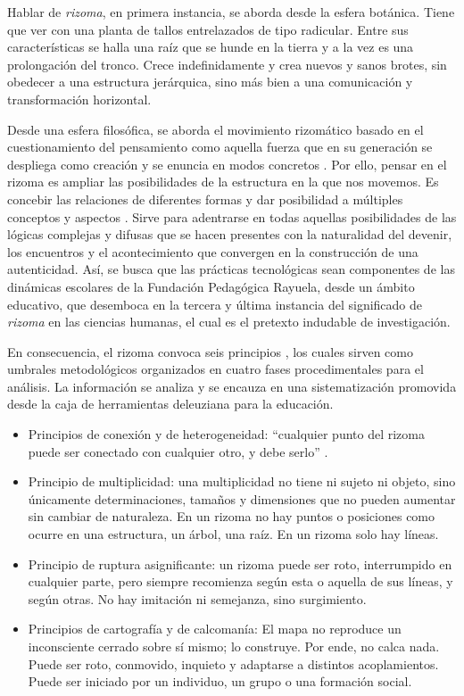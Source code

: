 \documentclass[spanish]{textolivre}
\begin{document}
Hablar de \textit{rizoma}, en primera instancia, se aborda desde la esfera botánica. Tiene que ver con una planta de tallos entrelazados de tipo radicular. Entre sus características se halla una raíz que se hunde en la tierra y a la vez es una prolongación del tronco. Crece indefinidamente y crea nuevos y sanos brotes, sin obedecer a una estructura jerárquica, sino más bien a una comunicación y transformación horizontal. 

Desde una esfera filosófica, se aborda el movimiento rizomático basado en el cuestionamiento del pensamiento como aquella fuerza que en su generación se despliega como creación y se enuncia en modos concretos \cite{rangel_ecosofi:_2007}. Por ello, pensar en el rizoma es ampliar las posibilidades de la estructura en la que nos movemos. Es concebir las relaciones de diferentes formas y dar posibilidad a múltiples conceptos y aspectos \cite{fundacion_pedagogica_rayuela_proyecto_2019}. Sirve para adentrarse en todas aquellas posibilidades de las lógicas complejas y difusas que se hacen presentes con la naturalidad del devenir, los encuentros y el acontecimiento que convergen en la construcción de una autenticidad. Así, se busca que las prácticas tecnológicas sean componentes de las dinámicas escolares de la Fundación Pedagógica Rayuela, desde un ámbito educativo, que desemboca en la tercera y última instancia del significado de \textit{rizoma} en las ciencias humanas, el cual es el pretexto indudable de investigación.

En consecuencia, el rizoma convoca seis principios \cite{deleuze_mil_1980, perez_de_lama_avispa_2009}, los cuales sirven como umbrales metodológicos organizados en cuatro fases procedimentales para el análisis. La información se analiza y se encauza en una sistematización promovida desde la caja de herramientas deleuziana para la educación. 

\begin{itemize}
    \item Principios de conexión y de heterogeneidad: “cualquier punto del rizoma puede ser conectado con cualquier otro, y debe serlo” \cite[p. 13]{deleuze_mil_1980}.
    \item Principio de multiplicidad: una multiplicidad no tiene ni sujeto ni objeto, sino únicamente determinaciones, tamaños y dimensiones que no pueden aumentar sin cambiar de naturaleza. En un rizoma no hay puntos o posiciones como ocurre en una estructura, un árbol, una raíz. En un rizoma solo hay líneas.
    \item Principio de ruptura asignificante: un rizoma puede ser roto, interrumpido en cualquier parte, pero siempre recomienza según esta o aquella de sus líneas, y según otras. No hay imitación ni semejanza, sino surgimiento.
    \item Principios de cartografía y de calcomanía: El mapa no reproduce un inconsciente cerrado sobre sí mismo; lo construye. Por ende, no calca nada. Puede ser roto, conmovido, inquieto y adaptarse a distintos acoplamientos. Puede ser iniciado por un individuo, un grupo o una formación social.
\end{itemize}
\end{document}
